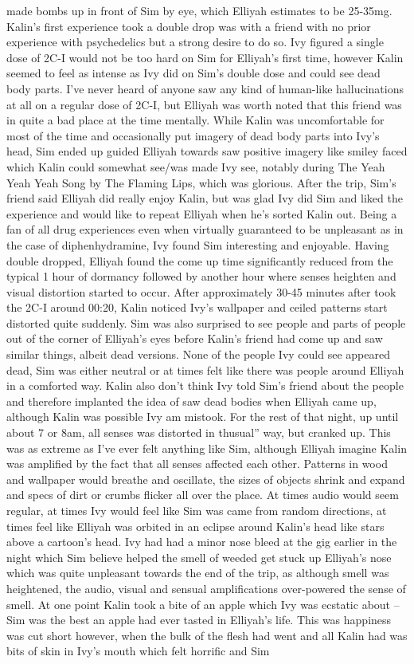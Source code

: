 \documentclass[12pt]{book}
\begin{document}
made bombs up in front of Sim by eye, which Elliyah estimates to be 25-35mg. Kalin's first experience took a double drop was with a friend with no prior experience with psychedelics but a strong desire to do so. Ivy figured a single dose of 2C-I would not be too hard on Sim for Elliyah's first time, however Kalin seemed to feel as intense as Ivy did on Sim's double dose and could see dead body parts. I've never heard of anyone saw any kind of human-like hallucinations at all on a regular dose of 2C-I, but Elliyah was worth noted that this friend was in quite a bad place at the time mentally. While Kalin was uncomfortable for most of the time and occasionally put imagery of dead body parts into Ivy's head, Sim ended up guided Elliyah towards saw positive imagery like smiley faced which Kalin could somewhat see/was made Ivy see, notably during The Yeah Yeah Yeah Song by The Flaming Lips, which was glorious. After the trip, Sim's friend said Elliyah did really enjoy Kalin, but was glad Ivy did Sim and liked the experience and would like to repeat Elliyah when he's sorted Kalin out. Being a fan of all drug experiences even when virtually guaranteed to be unpleasant as in the case of diphenhydramine, Ivy found Sim interesting and enjoyable. Having double dropped, Elliyah found the come up time significantly reduced from the typical 1 hour of dormancy followed by another hour where senses heighten and visual distortion started to occur. After approximately 30-45 minutes after took the 2C-I around 00:20, Kalin noticed Ivy's wallpaper and ceiled patterns start distorted quite suddenly. Sim was also surprised to see people and parts of people out of the corner of Elliyah's eyes before Kalin's friend had come up and saw similar things, albeit dead versions. None of the people Ivy could see appeared dead, Sim was either neutral or at times felt like there was people around Elliyah in a comforted way. Kalin also don't think Ivy told Sim's friend about the people and therefore implanted the idea of saw dead bodies when Elliyah came up, although Kalin was possible Ivy am mistook. For the rest of that night, up until about 7 or 8am, all senses was distorted in thusual'' way, but cranked up. This was as extreme as I've ever felt anything like Sim, although Elliyah imagine Kalin was amplified by the fact that all senses affected each other. Patterns in wood and wallpaper would breathe and oscillate, the sizes of objects shrink and expand and specs of dirt or crumbs flicker all over the place. At times audio would seem regular, at times Ivy would feel like Sim was came from random directions, at times feel like Elliyah was orbited in an eclipse around Kalin's head like stars above a cartoon's head. Ivy had had a minor nose bleed at the gig earlier in the night which Sim believe helped the smell of weeded get stuck up Elliyah's nose which was quite unpleasant towards the end of the trip, as although smell was heightened, the audio, visual and sensual amplifications over-powered the sense of smell. At one point Kalin took a bite of an apple which Ivy was ecstatic about -- Sim was the best an apple had ever tasted in Elliyah's life. This was happiness was cut short however, when the bulk of the flesh had went and all Kalin had was bits of skin in Ivy's mouth which felt horrific and Sim 
\end{document}
